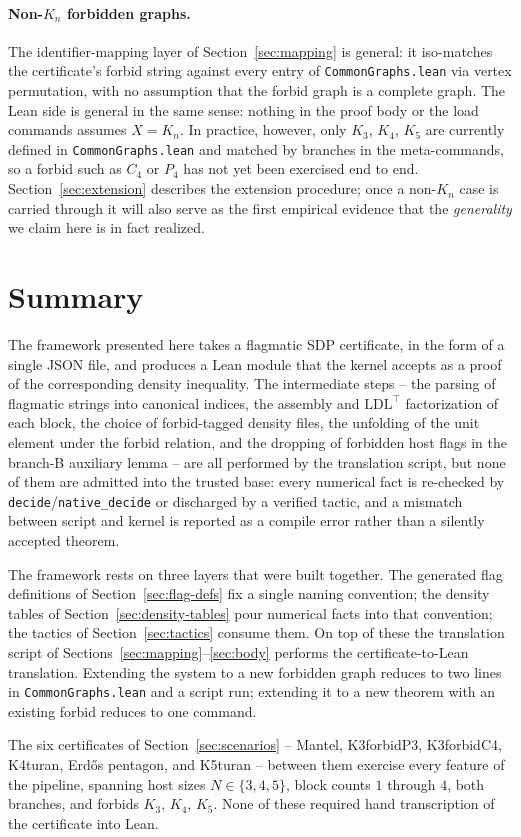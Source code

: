 \documentclass[11pt]{article}
\begin{document}
\paragraph{Non-$K_n$ forbidden graphs.}
The identifier-mapping layer of Section~\ref{sec:mapping} is general:
it iso-matches the certificate's forbid string against every entry of
\texttt{CommonGraphs.lean} via vertex permutation, with no assumption
that the forbid graph is a complete graph. The Lean side is general in
the same sense: nothing in the proof body or the load commands assumes
$X = K_n$. In practice, however, only $K_3$, $K_4$, $K_5$ are currently
defined in \texttt{CommonGraphs.lean} and matched by branches in the
meta-commands, so a forbid such as $C_4$ or $P_4$ has not yet been
exercised end to end. Section~\ref{sec:extension} describes the
extension procedure; once a non-$K_n$ case is carried through it will
also serve as the first empirical evidence that the
\emph{generality} we claim here is in fact realized.

\section{Summary}

The framework presented here takes a flagmatic SDP certificate, in the
form of a single JSON file, and produces a Lean module that the kernel
accepts as a proof of the corresponding density inequality. The
intermediate steps -- the parsing of flagmatic strings into canonical
indices, the assembly and $\mathrm{LDL}^\top$ factorization of each
block, the choice of forbid-tagged density files, the unfolding of the
unit element under the forbid relation, and the dropping of
forbidden host flags in the branch-B auxiliary lemma -- are all
performed by the translation script, but none of them are admitted into
the trusted base: every numerical fact is re-checked by
\texttt{decide}/\texttt{native\_decide} or discharged by a verified
tactic, and a mismatch between script and kernel is reported as a
compile error rather than a silently accepted theorem.

The framework rests on three layers that were built together. The
generated flag definitions of Section~\ref{sec:flag-defs} fix a single
naming convention; the density tables of
Section~\ref{sec:density-tables} pour numerical facts into that
convention; the tactics of Section~\ref{sec:tactics} consume them. On
top of these the translation script of
Sections~\ref{sec:mapping}--\ref{sec:body} performs the
certificate-to-Lean translation. Extending the system to a new
forbidden graph reduces to two lines in \texttt{CommonGraphs.lean} and
a script run; extending it to a new theorem with an existing forbid
reduces to one command.

The six certificates of Section~\ref{sec:scenarios} -- Mantel,
K3forbidP3, K3forbidC4, K4turan, Erd\H{o}s pentagon, and K5turan --
between them exercise every feature of the pipeline, spanning host sizes
$N \in \{3, 4, 5\}$, block counts $1$ through $4$, both branches, and
forbids $K_3$, $K_4$, $K_5$. None of these required hand transcription
of the certificate into Lean.
\end{document}
